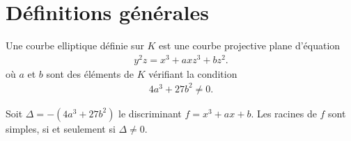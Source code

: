 \chapter{Définitions générales}

\begin{definition}
    \label{def:ell}
    Une courbe elliptique définie sur $K$ est une courbe projective plane d'équation
    \begin{align}
        \label{eq:ell}
    y^2z=x^3+axz^3+bz^2
    .\end{align}
    où $a$ et $b$ sont des éléments de $K$ vérifiant la condition
    \begin{align}
        \label{eq:delta}
    4a^3+27b^2\neq 0
    .\end{align}
\end{definition}

\begin{lemme}
    \label{lem:lemme1}
    Soit $\Delta= -(4a^3 + 27b^2)$ le discriminant $f = x^3 + ax + b$. 
    Les racines de $f$ sont simples, si et seulement si $\Delta \neq 0$.
\end{lemme}

